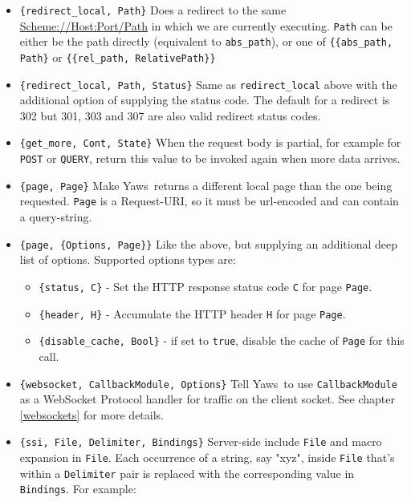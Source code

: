 \documentclass[11pt,oneside,english]{book}
\newcommand{\Yaws}            %
        {{\sc Yaws}}
\begin{document}
\begin{itemize}
\item \verb+{redirect_local, Path}+ Does a redirect to the same
  \url{Scheme://Host:Port/Path} in which we are currently
  executing. \verb+Path+ can be either be the path directly
  (equivalent to \verb+abs_path+), or one of \verb+{{abs_path, Path}+
  or \verb+{{rel_path, RelativePath}}+

\item \verb+{redirect_local, Path, Status}+ Same as
  \verb+redirect_local+ above with the additional option of supplying
  the status code. The default for a redirect is 302 but 301, 303 and
  307 are also valid redirect status codes.

\item \verb+{get_more, Cont, State}+ When the request body is partial,
  for example for \verb+POST+ or \verb+QUERY+, return this value to be
  invoked again when more data arrives.

\item \verb+{page, Page}+ Make \Yaws\ returns a different local page than the
  one being requested. \verb+Page+ is a Request-URI, so it must be url-encoded
  and can contain a query-string.

\item \verb+{page, {Options, Page}}+ Like the above, but supplying an
  additional deep list of options.  Supported options types are:

  \begin{itemize}
    \item \verb+{status, C}+ - Set the HTTP response status code \verb+C+ for
      page \verb+Page+.
    \item \verb+{header, H}+ - Accumulate the HTTP header \verb+H+ for page
      \verb+Page+.
    \item \verb+{disable_cache, Bool}+ - if set to \verb+true+, disable the
      cache of \verb+Page+ for this call.
  \end{itemize}

\item \verb+{websocket, CallbackModule, Options}+ Tell \Yaws\  to use
  \verb+CallbackModule+ as a WebSocket Protocol handler for traffic
  on the client socket. See chapter \ref{websockets} for more details.

\item \verb+{ssi, File, Delimiter, Bindings}+ Server-side include \verb+File+ and
  macro expansion in \verb+File+. Each occurrence of a string, say "xyz", inside
  \verb+File+ that's within a \verb+Delimiter+ pair is replaced with the
  corresponding value in \verb+Bindings+. For example:


\end{itemize}
\end{document}
